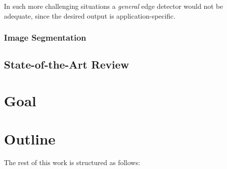 In such more challenging situations a \textit{general} edge detector would not be adequate, since the desired output is application-specific.


\subsubsection{Image Segmentation}
\subsection{State-of-the-Art Review}
\section{Goal}
\section{Outline}
The rest of this work is structured as follows:


